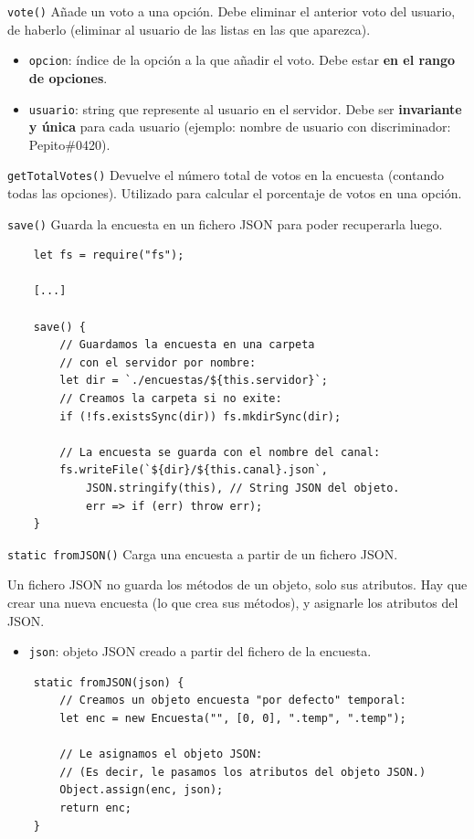 \documentclass[10pt]{beamer} %
\begin{document}
\begin{frame}{\texttt{vote()}}
    Añade un voto a una opción. Debe eliminar el anterior voto del usuario, de haberlo (eliminar al usuario de las listas en las que aparezca).
    \begin{itemize}
        \item \texttt{opcion}: índice de la opción a la que añadir el voto. Debe estar \textbf{en el rango de opciones}.
        \item \texttt{usuario}: string que represente al usuario en el servidor. Debe ser \textbf{invariante y única} para cada usuario (ejemplo: nombre de usuario con discriminador: Pepito\#0420).
    \end{itemize}
\end{frame}
\begin{frame}{\texttt{getTotalVotes()}}
    Devuelve el número total de votos en la encuesta (contando todas las opciones). Utilizado para calcular el porcentaje de votos en una opción.
\end{frame}
\begin{frame}[fragile]{\texttt{save()}}
    Guarda la encuesta en un fichero JSON para poder recuperarla luego.
    \begin{verbatim}
    let fs = require("fs");
    
    [...]
    
    save() {
        // Guardamos la encuesta en una carpeta
        // con el servidor por nombre:
        let dir = `./encuestas/${this.servidor}`;
        // Creamos la carpeta si no exite:
        if (!fs.existsSync(dir)) fs.mkdirSync(dir);
        
        // La encuesta se guarda con el nombre del canal:
        fs.writeFile(`${dir}/${this.canal}.json`,
            JSON.stringify(this), // String JSON del objeto.
            err => if (err) throw err);
    }
    \end{verbatim}
\end{frame}
\begin{frame}[fragile]{\texttt{static fromJSON()}}
    Carga una encuesta a partir de un fichero JSON.\par
    Un fichero JSON no guarda los métodos de un objeto, solo sus atributos. Hay que crear una nueva encuesta (lo que crea sus métodos), y asignarle los atributos del JSON.
    \begin{itemize}
        \item \texttt{json}: objeto JSON creado a partir del fichero de la encuesta.
    \end{itemize}
    \begin{verbatim}
    static fromJSON(json) {
        // Creamos un objeto encuesta "por defecto" temporal:
        let enc = new Encuesta("", [0, 0], ".temp", ".temp");
        
        // Le asignamos el objeto JSON:
        // (Es decir, le pasamos los atributos del objeto JSON.)
        Object.assign(enc, json);
        return enc;
    }
    \end{verbatim}
\end{frame}
\end{document}
